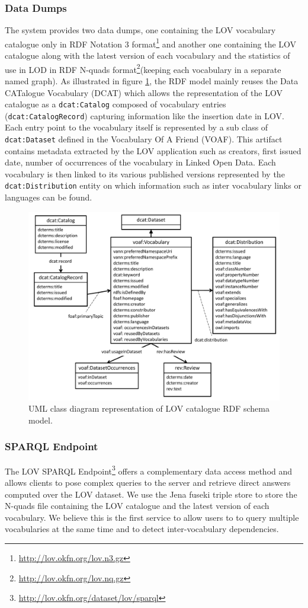\documentclass{iosart2c}
\begin{document}
\subsubsection{Data Dumps}
The system provides two data dumps, one containing the LOV vocabulary catalogue only in RDF Notation 3 format\footnote{\url{http://lov.okfn.org/lov.n3.gz}} and another one containing the LOV catalogue along with the latest version of each vocabulary and the statistics of use in LOD in RDF N-quads format\footnote{\url{http://lov.okfn.org/lov.nq.gz}}(keeping each vocabulary in a separate named graph). As illustrated in figure \ref{fig:model}, the RDF model mainly reuses the Data CATalogue Vocabulary (DCAT) which allows the representation of the LOV catalogue as a \texttt{dcat:Catalog} composed of vocabulary entries (\texttt{dcat:CatalogRecord}) capturing information like the insertion date in LOV. Each entry point to the vocabulary itself is represented by a sub class of \texttt{dcat:Dataset} defined in the Vocabulary Of A Friend (VOAF). This artifact contains metadata extracted by the LOV application such as creators, first issued date, number of occurrences of the vocabulary in Linked Open Data. Each vocabulary is then linked to its various published versions represented by the \texttt{dcat:Distribution} entity on which information such as inter vocabulary links or languages can be found.

\begin{figure}[!htb]
\includegraphics[width=.9\textwidth]{LOV_model.pdf}
\caption{UML class diagram representation of LOV catalogue RDF schema model.}
\label{fig:model}
\end{figure}


\subsubsection{SPARQL Endpoint}
The LOV SPARQL Endpoint\footnote{\url{http://lov.okfn.org/dataset/lov/sparql}} offers a complementary data access method and allows clients to pose complex queries to the server and retrieve direct answers computed over the LOV dataset. We use the Jena fuseki triple store to store the N-quads file containing the LOV catalogue and the latest version of each vocabulary. We believe this is the first service to allow users to to query multiple vocabularies at the same time and to detect inter-vocabulary dependencies. 
\end{document}
